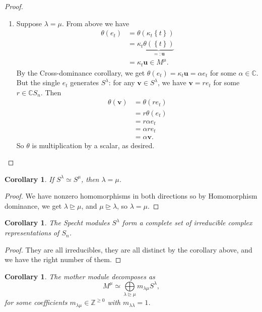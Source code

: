 \documentclass[12pt]{article}
\newcommand{\z}{\mathbb{Z}}
\newcommand{\cx}{\mathbb{C}}
\newcommand\paren[1]{\left( #1 \right)}
\newcommand\setb[1]{\left \{ #1 \right \}}
\newtheorem{corollary}[theorem]{Corollary}
\theoremstyle{definition}
\begin{document}
\begin{proof}
\begin{enumerate}
        \item Suppose $\lambda = \mu$. From above we have
        \begin{align*}
            \theta(e_t) & = \theta \paren{ \kappa_t \setb{ t } } \\
            & = \kappa_t \underbrace{ \theta \paren{ \setb{ t } } }_{ =: \mathbf{u} } \\
            & = \kappa_t \mathbf{u} \in M^{\mu}.
        \end{align*}
        By the Cross-dominance corollary, we get $\theta(e_t) = \kappa_t \mathbf{u} = \alpha e_t$ for some $\alpha \in \cx$. But the single $e_t$ generates $S^{\lambda}$: for any $\mathbf{v} \in S^{\lambda}$, we have $\mathbf{v} = re_t$ for some $r \in \cx S_n$. Then 
        \begin{align*}
            \theta(\mathbf{v}) & = \theta \paren{ r e_t } \\
            & = r \theta \paren{ e_t } \\
            & = r \alpha e_t \\
            & = \alpha r e_t \\
            & = \alpha \mathbf{v}.
        \end{align*}
        So $\theta$ is multiplication by a scalar, as desired.
    \end{enumerate}
\end{proof}
\begin{corollary}
    If $S^{\lambda} \simeq S^{\mu}$, then $\lambda = \mu$.
\end{corollary}
\begin{proof}
    We have nonzero homomorphisms in both directions so by Homomorphism dominance, we get $\lambda \trianglerighteq \mu$, and $\mu \trianglerighteq \lambda$, so $\lambda = \mu$.
\end{proof}
\begin{corollary}
    The Specht modules $S^{\lambda}$ form a complete set of irreducible complex representations of $S_n$.
\end{corollary}
\begin{proof}
    They are all irreducibles, they are all distinct by the corollary above, and we have the right number of them.
\end{proof}
\begin{corollary}
    The mother module decomposes as 
    \begin{equation}
        M^{\mu} \simeq \bigoplus\limits_{\lambda \trianglerighteq \mu} m_{\lambda \mu} S^{\lambda},
    \end{equation}
    for some coefficients $m_{\lambda \mu} \in \z^{\geq 0}$ with $m_{\lambda \lambda} = 1$.
\end{corollary}
\end{document}
